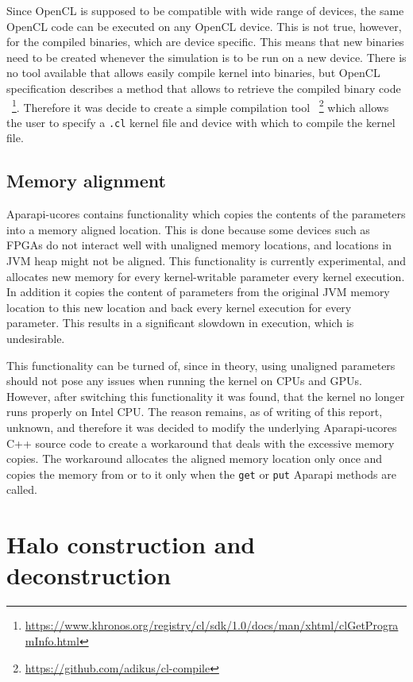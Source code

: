 \documentclass{l4proj}
\begin{document}
Since OpenCL is supposed to be compatible with wide range of devices, the same OpenCL
code can be executed on any OpenCL device. This is not true, however, for the 
compiled binaries, which are device specific. This means that new binaries need to 
be created whenever the simulation is to be run on a new device. There is no
tool available that allows easily compile kernel into binaries, but OpenCL specification
describes a method that allows to retrieve the compiled binary code
~\footnote{\url{https://www.khronos.org/registry/cl/sdk/1.0/docs/man/xhtml/clGetProgramInfo.html}}.
Therefore it was decide to create a simple compilation tool 
~\footnote{\url{https://github.com/adikus/cl-compile}}
which allows the user to specify a \texttt{.cl} kernel file and device with which to
compile the kernel file.

\subsection{Memory alignment}

Aparapi-ucores contains functionality which copies the contents of the parameters
into a memory aligned location. This is done because some devices such as FPGAs
do not interact well with unaligned memory locations, and locations in JVM heap
might not be aligned. This functionality is currently experimental, and allocates 
new memory for every kernel-writable parameter every kernel execution. In addition
it copies the content of parameters from the original JVM memory location to this new 
location and back every kernel execution for every parameter. This results in a significant 
slowdown in execution, which is undesirable.

This functionality can be turned of, since in theory, using unaligned parameters
should not pose any issues when running the kernel on CPUs and GPUs. However,
after switching this functionality it was found, that the kernel no longer runs
properly on Intel CPU. The reason remains, as of writing of this report, unknown,
and therefore it was decided to modify the underlying Aparapi-ucores C++ source code
to create a workaround that deals with the excessive memory copies. The workaround
allocates the aligned memory location only once and copies the memory from or to it
only when the \texttt{get} or \texttt{put} Aparapi methods are called.

\section{Halo construction and deconstruction}
\end{document}
